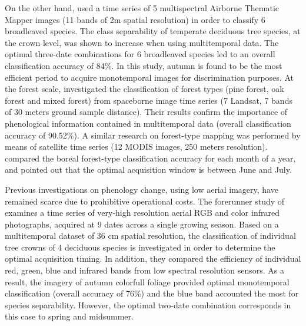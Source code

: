 \documentclass[remotesensing,article,submit,moreauthors,pdftex,12pt,a4paper]{mdpi} %
\begin{document}
On the other hand, \citeauthor{hill_mapping_2010} \cite{hill_mapping_2010} used a time series of 5 multispectral Airborne Thematic Mapper images (11 bands of 2m spatial resolution) in order to classify 6 broadleaved species. 
The class separability of temperate deciduous tree species, at the crown level, was shown to increase when using multitemporal data. 
The optimal three-date combinations for 6 broadleaved species led to an overall classification accuracy of 84\%. 
In this study, autumn is found to be the most efficient period to acquire monotemporal images for discrimination purposes. 
At the forest scale, \citeauthor{zhu_accurate_2014} \cite{zhu_accurate_2014} investigated the classification of forest types (pine forest, oak forest and mixed forest) from spaceborne image time series (7 Landsat, 7 bands of 30 meters ground sample distance). 
Their results confirm the importance of phenological information contained in multitemporal data (overall classification accuracy of 90.52\%). 
A similar research on forest-type mapping was performed by means of satellite time series (12 MODIS images, 250 meters resolution). 
\citeauthor{kempeneers_data_2011} \cite{kempeneers_data_2011} compared the boreal forest-type classification accuracy for each month of a year, and pointed out that the optimal acquisition window is between June and July.


Previous investigations on phenology change, using low aerial imagery, have remained scarce due to prohibitive operational costs. 
The forerunner study of \citeauthor{key_comparison_2001} \cite{key_comparison_2001} examines a time series of very-high resolution aerial RGB and color infrared photographs, acquired at 9 dates across a single growing season. 
Based on a multitemporal dataset of 36 cm spatial resolution, the classification of individual tree crowns of 4 deciduous species is investigated in order to determine the optimal acquisition timing. 
In addition, they compared the efficiency of individual red, green, blue and infrared bands from low spectral resolution sensors. 
As a result, the imagery of autumn colorfull foliage provided optimal monotemporal classification (overall accuracy of 76\%) and the blue band accounted the most for species separability. 
However, the optimal two-date combination corresponds in this case to spring and midsummer. 
\end{document}
